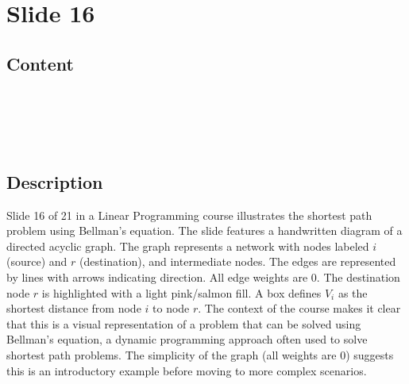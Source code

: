 \documentclass{article}%
\begin{document}
%
\newpage%
\section{Slide 16}%
\label{sec:Slide16}%
\subsection{Content}%

 \\
 \\
 \\
%
\subsection{Description}%
Slide 16 of 21 in a Linear Programming course illustrates the shortest path problem using Bellman's equation.  The slide features a handwritten diagram of a directed acyclic graph. The graph represents a network with nodes labeled $i$ (source) and $r$ (destination), and intermediate nodes. The edges are represented by lines with arrows indicating direction.  All edge weights are 0. The destination node $r$ is highlighted with a light pink/salmon fill. A box defines $V_i$ as the shortest distance from node $i$ to node $r$. The context of the course makes it clear that this is a visual representation of a problem that can be solved using Bellman's equation, a dynamic programming approach often used to solve shortest path problems. The simplicity of the graph (all weights are 0) suggests this is an introductory example before moving to more complex scenarios.%
\end{document}
